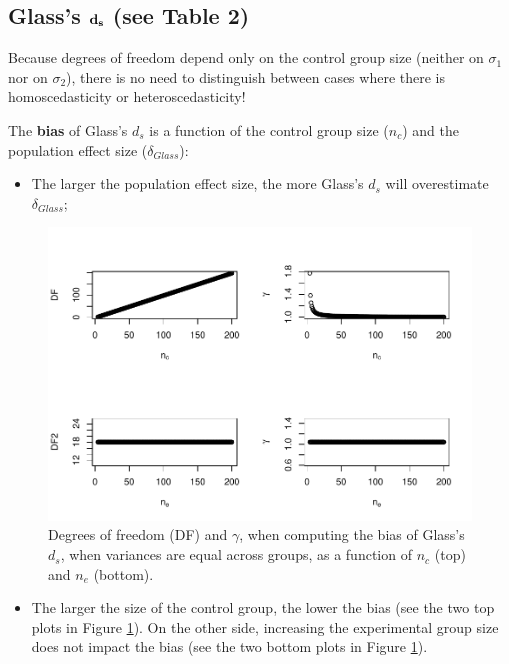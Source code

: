\documentclass[
  english,
  man]{apa6}
\providecommand{\tightlist}{%
  \setlength{\itemsep}{0pt}\setlength{\parskip}{0pt}}
\begin{document}
\hypertarget{glasss-bf-d_s-see-table-2}{%
\subsection{\texorpdfstring{Glass's \(\bf d_s\) (see Table 2)}{Glass's \textbackslash bf d\_s (see Table 2)}}\label{glasss-bf-d_s-see-table-2}}

Because degrees of freedom depend only on the control group size (neither on \(\sigma_1\) nor on \(\sigma_2\)), there is no need to distinguish between cases where there is homoscedasticity or heteroscedasticity!

The \textbf{bias} of Glass's \(d_s\) is a function of the control group size (\(n_c\)) and the population effect size (\(\delta_{Glass}\)):

\begin{itemize}
\tightlist
\item
  The larger the population effect size, the more Glass's \(d_s\) will overestimate \(\delta_{Glass}\);
\end{itemize}

\begin{figure}
\centering
\includegraphics{Theoretical-Bias-of-all-estimators-as-a-function-of-population-parameters_files/figure-latex/biasGlassctrlsize2-1.pdf}
\caption{\label{fig:biasGlassctrlsize2}Degrees of freedom (DF) and \(\gamma\), when computing the bias of Glass's \(d_s\), when variances are equal across groups, as a function of \(n_c\) (top) and \(n_e\) (bottom).}
\end{figure}

\begin{itemize}
\tightlist
\item
  The larger the size of the control group, the lower the bias (see the two top plots in Figure \ref{fig:biasGlassctrlsize2}). On the other side, increasing the experimental group size does not impact the bias (see the two bottom plots in Figure \ref{fig:biasGlassctrlsize2}).
\end{itemize}
\end{document}
